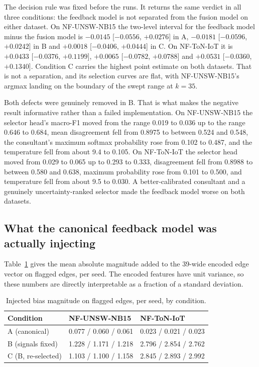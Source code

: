 The decision rule was fixed before the runs. It returns the same verdict in all three
conditions: the feedback model is not separated from the fusion model on either dataset. On NF-UNSW-NB15 the
two-level interval for the feedback model minus the fusion model is $-0.0145$ [$-0.0556$, $+0.0276$] in A, $-0.0181$
[$-0.0596$, $+0.0242$] in B and $+0.0018$ [$-0.0406$, $+0.0444$] in C. On NF-ToN-IoT it is
$+0.0433$ [$-0.0376$, $+0.1199$], $+0.0065$ [$-0.0782$, $+0.0788$] and $+0.0531$ [$-0.0360$,
$+0.1340$]. Condition C carries the highest point estimate on both datasets. That is not a
separation, and its selection curves are flat, with NF-UNSW-NB15's argmax landing on the
boundary of the swept range at $k = 35$.

Both defects were genuinely removed in B. That is what makes the negative result
informative rather than a failed implementation. On NF-UNSW-NB15 the selector head's macro-F1
moved from the range 0.019 to 0.036 up to the range 0.646 to 0.684, mean disagreement fell
from 0.8975 to between 0.524 and 0.548, the consultant's maximum softmax probability rose
from 0.102 to 0.487, and the temperature fell from about 9.4 to 0.105. On NF-ToN-IoT the
selector head moved from 0.029 to 0.065 up to 0.293 to 0.333, disagreement fell from 0.8988
to between 0.580 and 0.638, maximum probability rose from 0.101 to 0.500, and temperature
fell from about 9.5 to 0.030. A better-calibrated consultant and a genuinely
uncertainty-ranked selector made the feedback model worse on both datasets.

\FloatBarrier
\subsection{What the canonical feedback model was actually injecting}
\label{app:magnitudes}

Table~\ref{tab:magnitudes} gives the mean absolute magnitude added to the 39-wide encoded
edge vector on flagged edges, per seed. The encoded features have unit variance, so these numbers are
directly interpretable as a fraction of a standard deviation.

\begin{table}[htbp]
\centering
\caption[Injected bias magnitude on flagged edges, per seed, by condition]{Injected bias magnitude on flagged edges, per seed, by condition.}
\label{tab:magnitudes}
\small
\begin{tabular}{lll}
\toprule
Condition & NF-UNSW-NB15 & NF-ToN-IoT \\
\midrule
A (canonical)        & 0.077 / 0.060 / 0.061 & 0.023 / 0.021 / 0.023 \\
B (signals fixed)    & 1.228 / 1.171 / 1.218 & 2.796 / 2.854 / 2.762 \\
C (B, re-selected)   & 1.103 / 1.100 / 1.158 & 2.845 / 2.893 / 2.992 \\
\bottomrule
\end{tabular}
\end{table}

